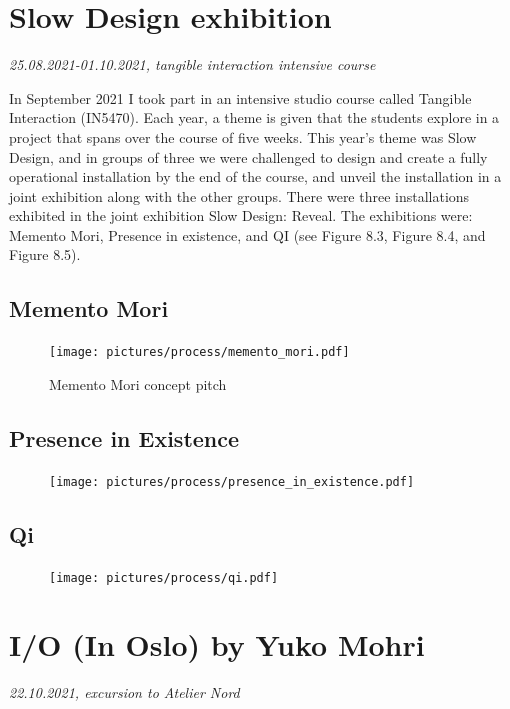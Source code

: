 \section{Slow Design exhibition}
\par
\emph{25.08.2021-01.10.2021, tangible interaction intensive course}
\par

In September 2021 I took part in an intensive studio course called Tangible Interaction (IN5470). Each year, a theme is given that the students explore in a project that spans over the course of five weeks. This year's theme was Slow Design, and in groups of three we were challenged to design and create a fully operational installation by the end of the course, and unveil the installation in a joint exhibition along with the other groups. There were three installations exhibited in the joint exhibition Slow Design: Reveal. The exhibitions were: Memento Mori, Presence in existence, and QI (see Figure 8.3, Figure 8.4, and Figure 8.5).

\subsection{Memento Mori}
\begin{figure}[H]
\texttt{[image: pictures/process/memento\_mori.pdf]}
\caption{Memento Mori concept pitch}
\centering 
\end{figure}

\subsection{Presence in Existence}
\begin{figure}[H]
\texttt{[image: pictures/process/presence\_in\_existence.pdf]}
\caption{}
\centering 
\end{figure}

\subsection{Qi}
\begin{figure}[H]
\texttt{[image: pictures/process/qi.pdf]}
\caption{}
\centering 
\end{figure}




\section{I/O (In Oslo) by Yuko Mohri}
\par
\emph{22.10.2021, excursion to Atelier Nord}
\par

